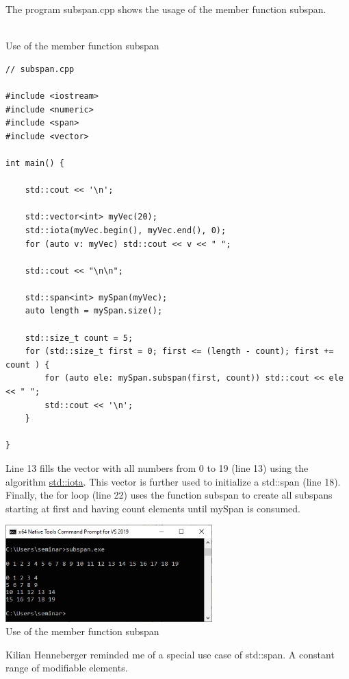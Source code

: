 The program subspan.cpp shows the usage of the member function subspan.

\hspace*{\fill} \\ %
\noindent
Use of the member function subspan
\begin{lstlisting}[style=styleCXX]
// subspan.cpp

#include <iostream>
#include <numeric>
#include <span>
#include <vector>

int main() {

	std::cout << '\n';
	
	std::vector<int> myVec(20);
	std::iota(myVec.begin(), myVec.end(), 0);
	for (auto v: myVec) std::cout << v << " ";
	
	std::cout << "\n\n";
	
	std::span<int> mySpan(myVec);
	auto length = mySpan.size();
	
	std::size_t count = 5;
	for (std::size_t first = 0; first <= (length - count); first += count ) {
		for (auto ele: mySpan.subspan(first, count)) std::cout << ele << " ";
		std::cout << '\n';
	}

}
\end{lstlisting}

Line 13 fills the vector with all numbers from 0 to 19 (line 13) using the algorithm \href{https://en.cppreference.com/w/cpp/algorithm/iota}{std::iota}. This vector is further used to initialize a std::span (line 18). Finally, the for loop (line 22) uses the function subspan to create all subspans starting at first and having count elements until mySpan is consumed.

\begin{center}
\includegraphics[width=0.6\textwidth]{content/3/chapter5/images/8.png}\\
Use of the member function subspan
\end{center}

Kilian Henneberger reminded me of a special use case of std::span. A constant range of modifiable elements.


